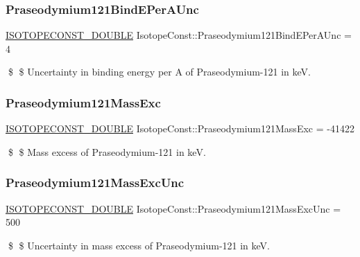\subsubsection{\texorpdfstring{Praseodymium121\+Bind\+E\+Per\+A\+Unc}{Praseodymium121BindEPerAUnc}}
{\footnotesize\ttfamily \mbox{\hyperlink{group___isotope_const-_macros_ga8f45a7272ce02c0b4c65c44636ed719a}{I\+S\+O\+T\+O\+P\+E\+C\+O\+N\+S\+T\+\_\+\+D\+O\+U\+B\+LE}} Isotope\+Const\+::\+Praseodymium121\+Bind\+E\+Per\+A\+Unc = 4}

\$ \$ Uncertainty in binding energy per A of Praseodymium-\/121 in keV. \mbox{\label{group___isotope_const-_praseodymium-_pr121_ga3973c1b67c14036d4eb3b03ca3c6ff97}} 
\subsubsection{\texorpdfstring{Praseodymium121\+Mass\+Exc}{Praseodymium121MassExc}}
{\footnotesize\ttfamily \mbox{\hyperlink{group___isotope_const-_macros_ga8f45a7272ce02c0b4c65c44636ed719a}{I\+S\+O\+T\+O\+P\+E\+C\+O\+N\+S\+T\+\_\+\+D\+O\+U\+B\+LE}} Isotope\+Const\+::\+Praseodymium121\+Mass\+Exc = -\/41422}

\$ \$ Mass excess of Praseodymium-\/121 in keV. \mbox{\label{group___isotope_const-_praseodymium-_pr121_ga83f7cc4219b404b8e91d5c3b31bb5140}} 
\subsubsection{\texorpdfstring{Praseodymium121\+Mass\+Exc\+Unc}{Praseodymium121MassExcUnc}}
{\footnotesize\ttfamily \mbox{\hyperlink{group___isotope_const-_macros_ga8f45a7272ce02c0b4c65c44636ed719a}{I\+S\+O\+T\+O\+P\+E\+C\+O\+N\+S\+T\+\_\+\+D\+O\+U\+B\+LE}} Isotope\+Const\+::\+Praseodymium121\+Mass\+Exc\+Unc = 500}

\$ \$ Uncertainty in mass excess of Praseodymium-\/121 in keV. \mbox{\label{group___isotope_const-_praseodymium-_pr121_gaa5fc8269f0a44c3634d6647206e286cc}} 
